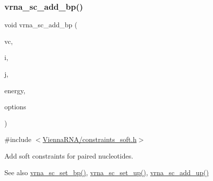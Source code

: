 \subsubsection{\texorpdfstring{vrna\+\_\+sc\+\_\+add\+\_\+bp()}{vrna\_sc\_add\_bp()}}
{\footnotesize\ttfamily void vrna\+\_\+sc\+\_\+add\+\_\+bp (\begin{DoxyParamCaption}\item[{\mbox{\hyperlink{group__fold__compound_ga1b0cef17fd40466cef5968eaeeff6166}{vrna\+\_\+fold\+\_\+compound\+\_\+t}} $\ast$}]{vc,  }\item[{int}]{i,  }\item[{int}]{j,  }\item[{\mbox{\hyperlink{group__data__structures_ga31125aeace516926bf7f251f759b6126}{F\+L\+T\+\_\+\+O\+R\+\_\+\+D\+BL}}}]{energy,  }\item[{unsigned int}]{options }\end{DoxyParamCaption})}



{\ttfamily \#include $<$\mbox{\hyperlink{constraints__soft_8h}{Vienna\+R\+N\+A/constraints\+\_\+soft.\+h}}$>$}



Add soft constraints for paired nucleotides. 

\begin{DoxySeeAlso}{See also}
\mbox{\hyperlink{group__soft__constraints_ga8e4334b24bc91453fbcda490a4e331af}{vrna\+\_\+sc\+\_\+set\+\_\+bp()}}, \mbox{\hyperlink{group__soft__constraints_ga99ed63f3ef9e7fe3997932030487a344}{vrna\+\_\+sc\+\_\+set\+\_\+up()}}, \mbox{\hyperlink{group__soft__constraints_ga069915fe203a2c8e522dd37847177a09}{vrna\+\_\+sc\+\_\+add\+\_\+up()}}
\end{DoxySeeAlso}

